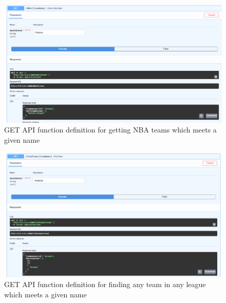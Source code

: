 \documentclass[12pt, letterpaper, final, onecolumn, titlepage] {article}
\begin{document}
\begin{figure}[htbp]
	\centerline{\includegraphics[scale=.4]{4/Get_NBA_team.png}}
	\caption{GET API function definition for getting NBA teams which meets a given name}
	\label{getNBATeam}
\end{figure}

\begin{figure}[htbp]
	\centerline{\includegraphics[scale=.4]{4/Get_FindTeam.png}}
	\caption{GET API function definition for finding any team in any league which meets a given name}
	\label{getfindTeam}
\end{figure}
\end{document}
